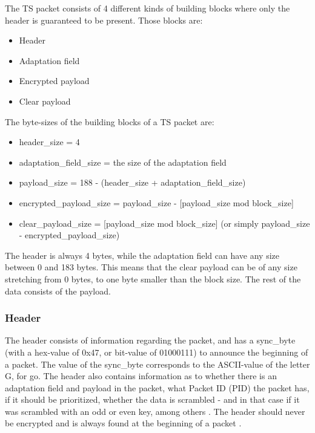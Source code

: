 The TS packet consists of 4 different kinds of building blocks where 
only the header is guaranteed to be present. Those blocks are:

\begin{itemize}
\item Header
\item Adaptation field
\item Encrypted payload
\item Clear payload
\end{itemize}

The byte-sizes of the building blocks of a TS packet are:

\begin{itemize}
\item header\_size = 4
\item adaptation\_field\_size = the size of the adaptation field
\item payload\_size = 188 - (header\_size + adaptation\_field\_size)
\item encrypted\_payload\_size = payload\_size - [payload\_size mod block\_size]
\item clear\_payload\_size = [payload\_size mod block\_size] 
  (or simply payload\_size - encrypted\_payload\_size)
\end{itemize}

The header is always 4 bytes, while the adaptation field can have any 
size between 0 and 183 bytes. This means that the clear payload can 
be of any size stretching from 0 bytes, to one byte smaller than the 
block size. The rest of the data consists of the payload.

\subsubsection{Header}
The header consists of information regarding the packet, and has a 
sync\_byte (with a hex-value of 0x47, or bit-value of 01000111) to 
announce the beginning of a packet. The value of the sync\_byte 
corresponds to the ASCII-value of the letter G, for go. 
The header also contains information as to whether there is an 
adaptation field and payload in the packet, what Packet ID (PID) the 
packet has, if it should be prioritized, whether the data is 
scrambled - and in that case if it was scrambled with an odd or even 
key, among others \citep[pp. 25--26]{etsiMPEG:2009}. The header should 
never be encrypted and is always found at the beginning of a packet 
\citep[pp. 10--11]{DVB:2013}.

